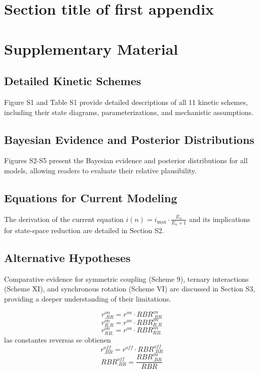 \documentclass[pdflatex,sn-mathphys-num]{sn-jnl}%
\theoremstyle{thmstyleone}%
\theoremstyle{thmstyletwo}%
\theoremstyle{thmstylethree}%
\begin{document}
\begin{appendices}

\section{Section title of first appendix}\label{secA1}
\section{Supplementary Material}

\subsection{Detailed Kinetic Schemes}
Figure S1 and Table S1 provide detailed descriptions of all 11 kinetic schemes, including their state diagrams, parameterizations, and mechanistic assumptions.

\subsection{Bayesian Evidence and Posterior Distributions}
Figures S2-S5 present the Bayesian evidence and posterior distributions for all models, allowing readers to evaluate their relative plausibility.

\subsection{Equations for Current Modeling}
The derivation of the current equation \( i(n) = i_{\text{max}} \cdot \frac{E_n}{E_n + 1} \) and its implications for state-space reduction are detailed in Section S2.

\subsection{Alternative Hypotheses}
Comparative evidence for symmetric coupling (Scheme 9), ternary interactions (Scheme XI), and synchronous rotation (Scheme VI) are discussed in Section S3, providing a deeper understanding of their limitations.

\begin{equation}
    r^{on}_{.BR}= r^{on} \cdot RBR^{on}_{.BR} 
	\label{eq:ron_BR}
\end{equation}
\begin{equation}
    r^{on}_{R.R}= r^{on} \cdot RBR^{on}_{R.R} 
	\label{eq:ronR_R}
\end{equation}
\begin{equation}
    r^{on}_{RB.}= r^{on} \cdot RBR^{on}_{RB.} 
	\label{eq:ronRB_}
\end{equation}
las constantes reversas se obtienen 
\begin{equation}
    r^{off}_{.BR}= r^{off} \cdot RBR^{off}_{.BR} 
	\label{eq:roff_BR}
\end{equation}
\begin{equation}
    RBR^{off}_{.BR} = \frac{RBR^{on}_{.BR}}{RBR}  \label{eq:RBRoff_BR}
\end{equation}





\end{appendices}
\end{document}
